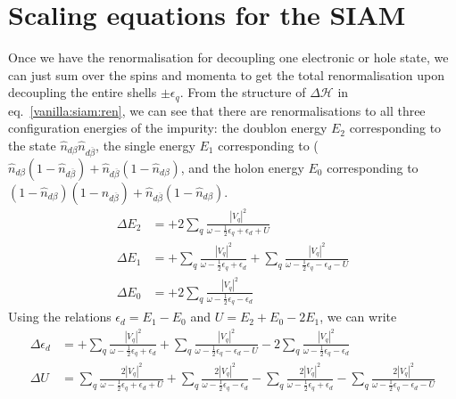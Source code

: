 \section{Scaling equations for the SIAM}
Once we have the renormalisation for decoupling one electronic or hole state, we can just sum over the spins and momenta to get the total renormalisation upon decoupling the entire shells \(\pm \epsilon_q\). From the structure of \(\Delta \mathcal{H}\) in eq.~\ref{vanilla:siam:ren}, we can see that there are renormalisations to all three configuration energies of the impurity: the doublon energy \(E_2\) corresponding to the state  \(\hat n_{d\beta}\hat n_{d\overline\beta}\), the single energy \(E_1\) corresponding to (\(\hat n_{d\beta}(1 - \hat n_{d\overline\beta}) + \hat n_{d\overline\beta}(1 - \hat n_{d\beta})\), and the holon energy \(E_0\) corresponding to \((1 - \hat n_{d\beta})(1 - \hat n_{d\overline\beta}) + \hat n_{d\overline\beta}(1 - \hat n_{d\beta})\).
\begin{equation}\begin{aligned}
	\label{urg-siam}
	\Delta E_2 &= +2\sum_{q}\frac{|V_q|^2}{\omega - \frac{1}{2}\epsilon_q + \epsilon_d + U }\\
	\Delta E_1 &= +\sum_{q}\frac{|V_q|^2}{\omega - \frac{1}{2}\epsilon_q + \epsilon_d} + \sum_{q}\frac{|V_q|^2}{\omega - \frac{1}{2}\epsilon_q - \epsilon_d - U}\\
	\Delta E_0 &= +2\sum_{q}\frac{|V_q|^2}{\omega - \frac{1}{2}\epsilon_q - \epsilon_d}
\end{aligned}\end{equation}
Using the relations \(\epsilon_d = E_1 - E_0\) and \(U = E_2 + E_0 - 2E_1\), we can write
\begin{equation}\begin{aligned}
	\Delta \epsilon_d &= +\sum_{q}\frac{|V_q|^2}{\omega - \frac{1}{2}\epsilon_q + \epsilon_d} + \sum_{q}\frac{|V_q|^2}{\omega - \frac{1}{2}\epsilon_q - \epsilon_d - U} - 2\sum_{q}\frac{|V_q|^2}{\omega - \frac{1}{2}\epsilon_q - \epsilon_d}\\
	\Delta U &= \sum_{q}\frac{2|V_q|^2}{\omega - \frac{1}{2}\epsilon_q + \epsilon_d + U } + \sum_{q}\frac{2|V_q|^2}{\omega - \frac{1}{2}\epsilon_q - \epsilon_d} - \sum_{q}\frac{2|V_q|^2}{\omega - \frac{1}{2}\epsilon_q + \epsilon_d} - \sum_{q}\frac{2|V_q|^2}{\omega - \frac{1}{2}\epsilon_q - \epsilon_d - U}\\
\end{aligned}\end{equation}
